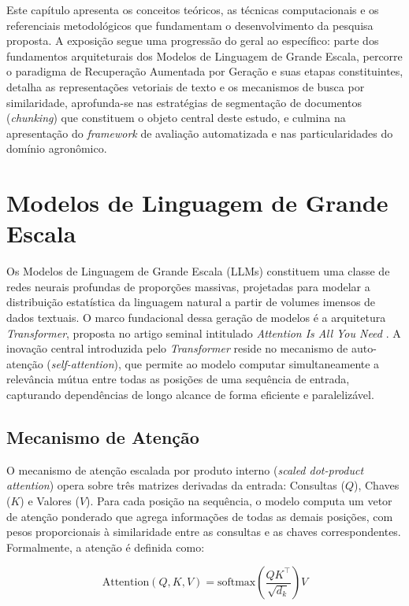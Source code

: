 \documentclass[
	12pt,				%
	openright,			%
	oneside,			%
	a4paper,			%
	tccpreliminar,		%
	]{ABNT-DC-UEL}
\begin{document}
Este capítulo apresenta os conceitos teóricos, as técnicas computacionais e os referenciais metodológicos que fundamentam o desenvolvimento da pesquisa proposta. A exposição segue uma progressão do geral ao específico: parte dos fundamentos arquiteturais dos Modelos de Linguagem de Grande Escala, percorre o paradigma de Recuperação Aumentada por Geração e suas etapas constituintes, detalha as representações vetoriais de texto e os mecanismos de busca por similaridade, aprofunda-se nas estratégias de segmentação de documentos (\textit{chunking}) que constituem o objeto central deste estudo, e culmina na apresentação do \textit{framework} de avaliação automatizada e nas particularidades do domínio agronômico.


\section{Modelos de Linguagem de Grande Escala}
\label{sec:llms}

Os Modelos de Linguagem de Grande Escala (LLMs) constituem uma classe de redes neurais profundas de proporções massivas, projetadas para modelar a distribuição estatística da linguagem natural a partir de volumes imensos de dados textuais. O marco fundacional dessa geração de modelos é a arquitetura \textit{Transformer}, proposta no artigo seminal intitulado \textit{Attention Is All You Need} \cite{vaswani2017attention}. A inovação central introduzida pelo \textit{Transformer} reside no mecanismo de auto-atenção (\textit{self-attention}), que permite ao modelo computar simultaneamente a relevância mútua entre todas as posições de uma sequência de entrada, capturando dependências de longo alcance de forma eficiente e paralelizável.

\subsection{Mecanismo de Atenção}

O mecanismo de atenção escalada por produto interno (\textit{scaled dot-product attention}) opera sobre três matrizes derivadas da entrada: Consultas ($Q$), Chaves ($K$) e Valores ($V$). Para cada posição na sequência, o modelo computa um vetor de atenção ponderado que agrega informações de todas as demais posições, com pesos proporcionais à similaridade entre as consultas e as chaves correspondentes. Formalmente, a atenção é definida como:

\begin{equation}
\text{Attention}(Q, K, V) = \text{softmax}\!\left(\frac{QK^{\top}}{\sqrt{d_k}}\right)V
\end{equation}
\end{document}
